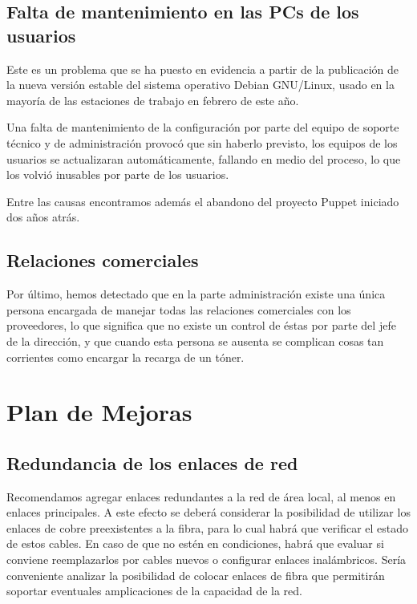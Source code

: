 \documentclass[a4paper,11pt,oneside]{article}
\begin{document}
\subsection*{Falta de mantenimiento en las PCs de los usuarios}
Este es un problema que se ha puesto en evidencia a partir de la
publicación de la nueva versión estable del sistema operativo Debian
GNU/Linux, usado en la mayoría de las estaciones de trabajo en febrero
de este año.

Una falta de mantenimiento de la configuración por parte del equipo de
soporte técnico y de administración provocó que sin haberlo previsto,
los equipos de los usuarios se actualizaran automáticamente, fallando
en medio del proceso, lo que los volvió inusables por parte de los
usuarios.

Entre las causas encontramos además el abandono del proyecto Puppet
iniciado dos años atrás.
%
%
\subsection*{Relaciones comerciales}
Por último, hemos detectado que en la parte administración existe una
única persona encargada de manejar todas las relaciones comerciales
con los proveedores, lo que significa que no existe un control de
éstas por parte del jefe de la dirección, y que cuando esta persona se
ausenta se complican cosas tan corrientes como encargar la recarga de
un tóner.
\newpage
\section{Plan de Mejoras}
\subsection*{Redundancia de los enlaces de red}
Recomendamos agregar enlaces redundantes a la red de área local, al
menos en enlaces principales. A este efecto se deberá considerar la
posibilidad de utilizar los enlaces de cobre preexistentes a la fibra,
para lo cual habrá que verificar el estado de estos cables. En caso de
que no estén en condiciones, habrá que evaluar si conviene
reemplazarlos por cables nuevos o configurar enlaces
inalámbricos. Sería conveniente analizar la posibilidad de colocar
enlaces de fibra que permitirán soportar eventuales amplicaciones de
la capacidad de la red.
\end{document}

